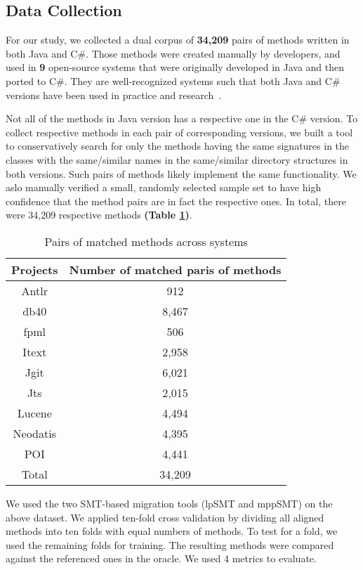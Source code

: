 \subsection{Data Collection}

For our study, we collected a dual corpus of \textbf{34,209} pairs of
methods written in both Java and C\#. Those methods were created
manually by developers, and used in \textbf{9} open-source systems
that were originally developed in Java and then ported to C\#. They
are well-recognized systems such that both Java and C\# versions have
been used in practice and research~\cite{ase15}.

Not all of the methods in Java version has a respective one in the C\#
version. To collect respective methods in each pair of corresponding
versions, we built a tool to conservatively search for only the
methods having the same signatures in the classes with the
same/similar names in the same/similar directory structures in both
versions. Such pairs of methods likely implement the same
functionality. We aslo manually verified a small, randomly selected
sample set to have high confidence that the method pairs are in fact
the respective ones. In total, there were 34,209 respective methods
\textbf{(Table \ref{table:methods})}.

\begin{table}
\begin{tabular}{|c | c|}
\hline
Projects & Number of matched paris of methods \\
\hline
Antlr & 912 \\
db40 & 8,467 \\
fpml & 506	\\
Itext & 2,958	\\
Jgit & 6,021 	\\
Jts & 2,015	\\
Lucene & 4,494	\\
Neodatis & 4,395	\\
POI & 4,441 \\
\hline
Total & 34,209 \\
\hline
\end{tabular}
\caption{Pairs of matched methods across systems}
\label{table:methods}
\end{table}

We used the two SMT-based migration tools (lpSMT and mppSMT) on the
above dataset. We applied ten-fold cross validation by dividing all
aligned methods into ten folds with equal numbers of methods. To test
for a fold, we used the remaining folds for training. The resulting
methods were compared against the referenced ones in the oracle. We
used 4 metrics to evaluate.

